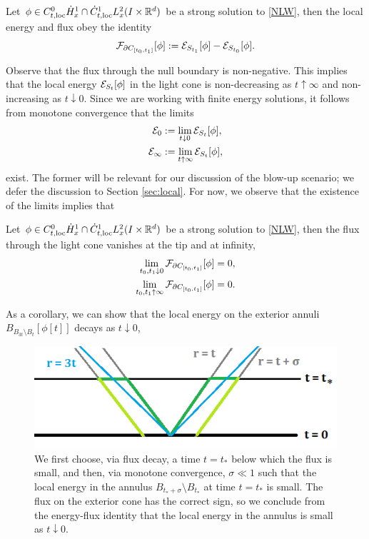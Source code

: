 \begin{proposition}\label{prop:energyflux}
	Let $\phi \in C^0_{t, \mathrm{loc}} \dot H^1_x \cap \dot C^1_{t, \mathrm{loc}} L^2_x (I \times \mathbb R^d)$ be a strong solution to \eqref{NLW}, then the local energy and flux obey the identity
		\[
			\mathcal F_{\partial C_{[t_0, t_1]}} [\phi] := \mathcal E_{S_{t_1}} [\phi] - \mathcal E_{S_{t_0}} [\phi].
		\]
\end{proposition}

Observe that the flux through the null boundary is non-negative. This implies that the local energy $\mathcal E_{S_t} [\phi]$ in the light cone is non-decreasing as $t \uparrow \infty$ and non-increasing as $t \downarrow 0$. Since we are working with finite energy solutions, it follows from monotone convergence that the limits
	\begin{align*}
		\mathcal E_0
			&:=\lim_{t \downarrow 0} \mathcal E_{S_t} [\phi],\\
		\mathcal E_\infty
			&:= \lim_{t \uparrow \infty} \mathcal E_{S_t} [\phi],
	\end{align*}
exist. The former will be relevant for our discussion of the blow-up scenario; we defer the discussion to Section \ref{sec:local}. For now, we observe that the existence of the limits implies that

\begin{corollary}\label{cor:fluxdecay}
	Let $\phi \in C^0_{t, \mathrm{loc}} \dot H^1_x \cap \dot C^1_{t, \mathrm{loc}} L^2_x (I \times \mathbb R^d)$ be a strong solution to \eqref{NLW}, then the flux through the light cone vanishes at the tip and at infinity, 
		\begin{align*}
			\lim_{t_0, t_1 \downarrow 0} \mathcal F_{\partial C_{[t_0, t_1]}} [\phi]
				&= 0, \\
			\lim_{t_0, t_1 \uparrow \infty} \mathcal F_{\partial C_{[t_0, t_1]}} [\phi] 
				&= 0.	
		\end{align*}
\end{corollary}

As a corollary, we can show that the local energy on the exterior annuli $B_{B_{3t} \setminus B_t}[\phi[t]]$ decays as $t\downarrow 0$, 

\begin{figure}[h]
	\begin{center}
		\includegraphics{graphics/exterior}
		\caption{We first choose, via flux decay, a time $t = t_*$ below which the flux is small, and then, via monotone convergence, $\sigma \ll 1$ such that the local energy in the annulus $B_{t_* + \sigma} \setminus B_{t_*}$ at time $t = t_*$ is small. The flux on the exterior cone has the correct sign, so we conclude from the energy-flux identity that the local energy in the annulus is small as $t \downarrow 0$. }
	\end{center}
\end{figure}

